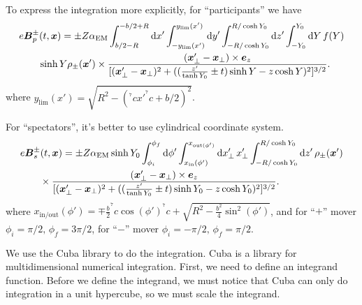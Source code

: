\documentclass{cweb}
\begin{document}
\fi

To express the integration more explicitly, for  ``participants'' we have
\begin{equation}
\begin{split}
&e\vb*{B}_p^\pm (t, \vb*{x}) = \pm Z \alpha_{\text{EM}} \int_{b/2-R}^{-b/2+R} %
\dd{x'} \int_{-y_{\text{lim}}(x')}^{y_{\text{lim}}(x')} \dd{y'} \int_{-R/\cosh
Y_0}^{R/\cosh Y_0} \dd{z'} \int_{-Y_0}^{Y_0} \dd{Y} f(Y)  \\
&\qquad \sinh Y \rho_\pm(\vb*{x}') \times \frac{(\vb*{x}'_\perp - \vb*{x}_%
\perp)\times \vb*{e}_z}{[(\vb*{x}'_\perp - \vb*{x}_\perp)^2 + ((\frac{z'}{\tanh
Y_0} \pm t)\sinh Y - z\cosh Y)^2]^{3/2}}.
\end{split}
\end{equation}
where $y_{\text{lim}}(x') = \sqrt{R^2 - (^^7c x' ^^7c + b/2)^2}$.

For ``spectators'', it's better to use cylindrical coordinate system.
\begin{equation}
\begin{split}
&e\vb*{B}_s^\pm (t,\vb*{x}) = \pm Z \alpha_{\text{EM}} \sinh Y_0 \int_{%
\phi_i}^{\phi_f} \dd{\phi'} \int_{x_{\text{in}}(\phi')}^{x_{\text{out}(\phi')}}
\dd{x'_\perp} x'_\perp \int_{-R/\cosh Y_0}^{R/\cosh Y_0} \dd{z'} \rho_\pm(%
\vb*{x}') \\
&\qquad \times \frac{(\vb*{x}'_\perp - \vb*{x}_\perp)\times \vb*{e}_z}{[(%
\vb*{x}'_\perp - \vb*{x}_\perp)^2 + ((\frac{z'}{\tanh Y_0} \pm t)\sinh Y_0 - z%
\cosh Y_0)^2]^{3/2}}.
\end{split}
\end{equation}
where $x_{\text{in/out}}(\phi') = \mp \frac{b}{2} ^^7c \cos(\phi') ^^7c + %
\sqrt{R^2 - \frac{b^2}{4} \sin^2(\phi')}$, and for ``$+$'' mover $\phi_i = %
\pi/2,\, \phi_f = 3\pi/2$, for ``$-$'' mover $\phi_i = -\pi/2,\, \phi_f = %
\pi/2$.


\fi

We use the Cuba library to do the integration. Cuba is a library for
multidimensional numerical integration. First, we need to define an integrand
function. Before we define the integrand, we must notice that Cuba can only do
integration in a unit hypercube, so we must scale the integrand.

\fi
\end{document}
